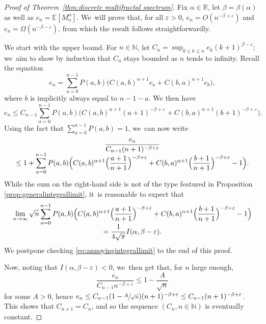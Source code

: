\documentclass[JEP,XML,SOM,Unicode,NoFloatCountersInSection, NoEqCountersInSection,published]{cedram}
\newcommand{\E}{\mathbb{E}}
\newcommand{\R}{{\mathbb{R}}}
\newcommand{\N}{\mathbb{N}}
\let\veps\varepsilon
\theoremstyle{definition}
\begin{document}
\begin{proof}[Proof of Theorem~\ref{thm:discrete multifractal spectrum}]Fix $\alpha\in\R$, let $\beta=\beta(\alpha)$ as well as $e_n=\E[M_n^\alpha]$. We~will prove that, for all $\veps>0$, $e_n=O(n^{-\beta+\veps})$ and $e_n=\Omega(n^{-\beta-\veps})$, from which the result follows straightforwardly.

We start with the upper bound. For $n\in\N$, let $C_n=\sup_{0\leq k\leq n}e_k (k+1)^{\beta-\veps};$ we~aim to show by induction that $C_n$ stays bounded as $n$ tends to infinity. Recall the equation\vspace*{-3pt}
\[
e_n=\sum_{a=0}^{n-1}P(a,b)\bigl(C(a,b)^{\alpha+1}e_a+C(b,a)^{\alpha+1}e_b\bigr),
\]
where $b$ is implicitly always equal to $n-1-a$. We then have\vspace*{-3pt}
\[
e_n\leq C_{n-1} \sum_{a=0}^{n-1}P(a,b)\bigl(C(a,b)^{\alpha+1}(a+1)^{-\beta+\veps}+C(b,a)^{\alpha+1}(b+1)^{-\beta+\veps}\bigr).
\]
Using the fact that $\sum_{a=0}^{n-1} P(a,b)=1$, we~can now write\vspace*{-5pt}
\begin{multline*}
\frac{e_n}{C_{n-1}(n+1)^{-\beta+\veps}}\\[-5pt]
\leq 1+ \sum_{a=0}^{n-1}P(a,b)\Bigl(C(a,b)^{\alpha+1}\Bigl(\frac{a+1}{n+1}\Bigr)^{-\beta+\veps}+C(b,a)^{\alpha+1}\Bigl(\frac{b+1}{n+1}\Bigr)^{-\beta+\veps}-1\Bigr).
\end{multline*}
While the sum on the right-hand side is not of the type featured in Proposition \ref{prop:generalintegrallimit}, it~is reasonable to expect that\vspace*{-5pt}
\begin{multline}\label{eq:annoyingintegrallimit}
\lim_{n\to\infty} \sqrt{n}\sum_{a=0}^{n-1}P(a,b)\Bigl(C(a,b)^{\alpha+1}\Bigl(\frac{a+1}{n+1}\Bigr)^{-\beta+\veps}+C(b,a)^{\alpha+1}\Bigl(\frac{b+1}{n+1}\Bigr)^{-\beta+\veps}-1\Bigr)\\[-5pt]
=\frac1{4\sqrt{\pi}}I(\alpha,\beta-\veps).
\end{multline}
We postpone checking \eqref{eq:annoyingintegrallimit} to the end of this proof.

Now, noting that $I(\alpha,\beta-\veps)<0$, we~then get that, for $n$ large enough,\vspace*{-3pt}
\[
\frac{e_n}{C_{n-1}n^{-\beta+\veps}}\leq 1-\frac{A}{\sqrt{n}}
\]
for some $A>0$, hence
$e_n\leq C_{n-1}(1-\sfrac{A}{\sqrt{n}})(n+1)^{-\beta+\veps}\leq C_{n-1}(n+1)^{-\beta+\veps}$.
This shows that $C_{n+1}=C_n$, and so the sequence $(C_n,n\in\N)$ is eventually constant.


\end{proof}
\end{document}
